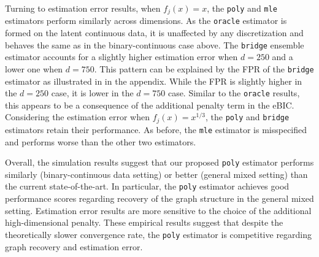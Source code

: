 Turning to estimation error results, when \(f_j(x) = x\), the \texttt{poly} and \texttt{mle} estimators perform similarly across dimensions. As the \texttt{oracle} estimator is formed on the latent continuous data, it is unaffected by any discretization and behaves the same as in the binary-continuous case above. The \texttt{bridge} ensemble estimator accounts for a slightly higher estimation error when \(d = 250\) and a lower one when \(d=750\). This pattern can be explained by the FPR of the \texttt{bridge} estimator as illustrated in  in the appendix. While the FPR is slightly higher in the \(d=250\) case, it is lower in the \(d=750\) case. Similar to the \texttt{oracle} results, this appears to be a consequence of the additional penalty term in the eBIC. Considering the estimation error when \(f_j(x) = x^{1/3}\), the \texttt{poly} and \texttt{bridge} estimators retain their performance. As before, the \texttt{mle} estimator is misspecified and performs worse than the other two estimators.

Overall, the simulation results suggest that our proposed \texttt{poly} estimator performs similarly (binary-continuous data setting) or better (general mixed setting) than the current state-of-the-art. In particular, the \texttt{poly} estimator achieves good performance scores regarding recovery of the graph structure in the general mixed setting. Estimation error results are more sensitive to the choice of the additional high-dimensional penalty. These empirical results suggest that despite the theoretically slower convergence rate, the \texttt{poly} estimator is competitive regarding graph recovery and estimation error.
